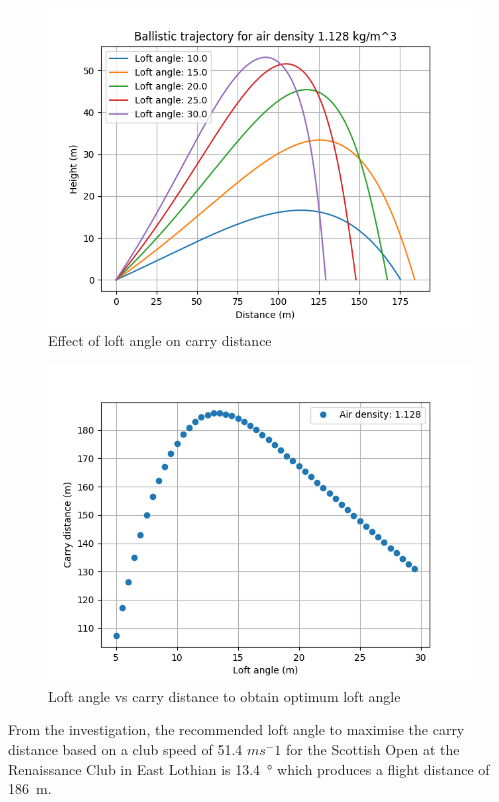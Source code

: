 \documentclass[12pt]{article}
\begin{document}
\begin{figure}[H]
\centering
\caption{Effect of loft angle on carry distance}
\includegraphics[scale=0.6]{results1128}
\end{figure}

\begin{figure}[H]
\centering
\caption{Loft angle vs carry distance to obtain optimum loft angle}
\includegraphics[scale=0.6]{results1128range}
\end{figure}

From the investigation, the recommended loft angle to maximise the carry distance based on a club speed of 51.4 $ms^-1$  for the Scottish Open at the Renaissance Club in East Lothian is \SI{13.4}{\degree} which produces a flight distance of \SI{186}{\metre}.
\end{document}
